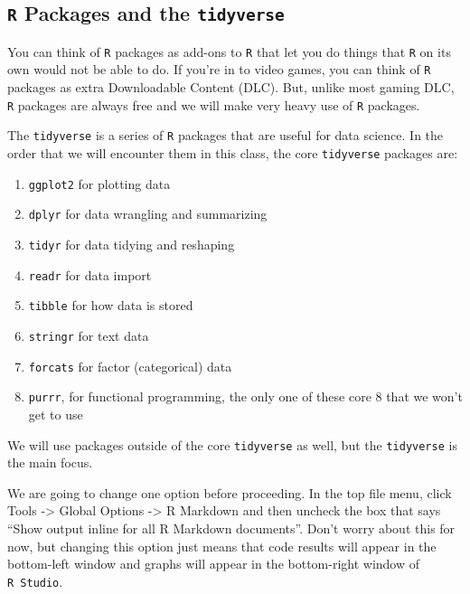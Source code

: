 \documentclass[
]{book}
\providecommand{\tightlist}{%
  \setlength{\itemsep}{0pt}\setlength{\parskip}{0pt}}
\begin{document}
\hypertarget{r-packages-and-the-tidyverse}{%
\subsection{\texorpdfstring{\texttt{R} Packages and the \texttt{tidyverse}}{R Packages and the tidyverse}}\label{r-packages-and-the-tidyverse}}

You can think of \texttt{R} packages as add-ons to \texttt{R} that let you do things that \texttt{R} on its own would not be able to do. If you're in to video games, you can think of \texttt{R} packages as extra Downloadable Content (DLC). But, unlike most gaming DLC, \texttt{R} packages are always free and we will make very heavy use of \texttt{R} packages.

The \texttt{tidyverse} is a series of \texttt{R} packages that are useful for data science. In the order that we will encounter them in this class, the core \texttt{tidyverse} packages are:

\begin{enumerate}
\def\labelenumi{\arabic{enumi}.}
\tightlist
\item
  \texttt{ggplot2} for plotting data
\item
  \texttt{dplyr} for data wrangling and summarizing
\item
  \texttt{tidyr} for data tidying and reshaping
\item
  \texttt{readr} for data import
\item
  \texttt{tibble} for how data is stored
\item
  \texttt{stringr} for text data
\item
  \texttt{forcats} for factor (categorical) data
\item
  \texttt{purrr}, for functional programming, the only one of these core 8 that we won't get to use
\end{enumerate}

We will use packages outside of the core \texttt{tidyverse} as well, but the \texttt{tidyverse} is the main focus.

We are going to change one option before proceeding. In the top file menu, click Tools -\textgreater{} Global Options -\textgreater{} R Markdown and then uncheck the box that says ``Show output inline for all R Markdown documents''. Don't worry about this for now, but changing this option just means that code results will appear in the bottom-left window and graphs will appear in the bottom-right window of \texttt{R\ Studio}.
\end{document}
